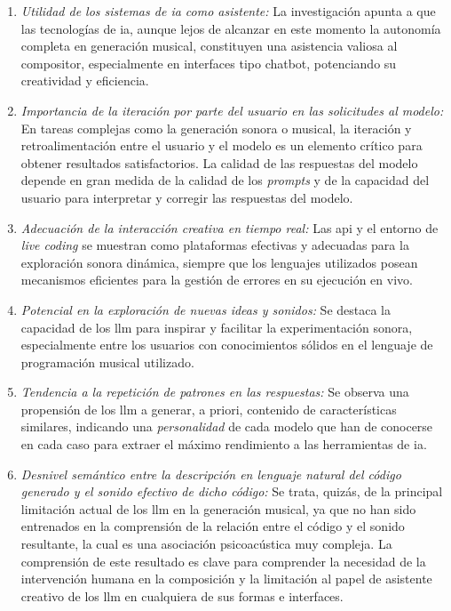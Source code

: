 \begin{enumerate}
    \item \textit{Utilidad de los sistemas de \gls{ia} como \emph{asistente}:} La investigación apunta a que las tecnologías de \gls{ia}, aunque lejos de alcanzar en este momento la autonomía completa en generación musical, constituyen una asistencia valiosa al compositor, especialmente en interfaces tipo chatbot, potenciando su creatividad y eficiencia.
    \item \textit{Importancia de la iteración por parte del usuario en las solicitudes al modelo:}
    En tareas complejas como la generación sonora o musical, la iteración y retroalimentación entre el usuario y el modelo es un elemento crítico para obtener resultados satisfactorios. La calidad de las respuestas del modelo depende en gran medida de la calidad de los \emph{prompts} y de la capacidad del usuario para interpretar y corregir las respuestas del modelo.
    \item \textit{Adecuación de la interacción creativa en tiempo real:} Las \gls{api} y el entorno de \emph{live coding} se muestran como plataformas efectivas y adecuadas para la exploración sonora dinámica, siempre que los lenguajes utilizados posean mecanismos eficientes para la gestión de errores en su ejecución en vivo.
    \item \textit{Potencial en la exploración de nuevas ideas y sonidos:} Se destaca la capacidad de los \gls{llm} para inspirar y facilitar la experimentación sonora, especialmente entre los usuarios con conocimientos sólidos en el lenguaje de programación musical utilizado.
    \item \textit{Tendencia a la repetición de patrones en las respuestas:} Se observa una propensión de los \gls{llm} a generar, a priori, contenido de características similares, indicando una \emph{personalidad} de cada modelo que han de conocerse en cada caso para extraer el máximo rendimiento a las herramientas de \gls{ia}.
    \item \textit{Desnivel semántico entre la descripción en lenguaje natural del código generado y el sonido efectivo de dicho código:} Se trata, quizás, de la principal limitación actual de los \gls{llm} en la generación musical, ya que no han sido entrenados en la comprensión de la relación entre el código y el sonido resultante, la cual es una asociación psicoacústica muy compleja. La comprensión de este resultado es clave para comprender la necesidad de la intervención humana en la composición y la limitación al papel de asistente creativo de los \gls{llm} en cualquiera de sus formas e interfaces.

\end{enumerate}

